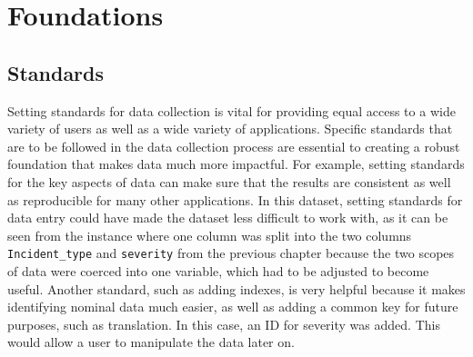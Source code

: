 \documentclass[
]{book}
\newenvironment{Shaded}{\begin{snugshade}}{\end{snugshade}}
\newcommand{\DataTypeTok}[1]{\textcolor[rgb]{0.13,0.29,0.53}{#1}}
\newcommand{\DecValTok}[1]{\textcolor[rgb]{0.00,0.00,0.81}{#1}}
\newcommand{\KeywordTok}[1]{\textcolor[rgb]{0.13,0.29,0.53}{\textbf{#1}}}
\newcommand{\NormalTok}[1]{#1}
\newcommand{\OperatorTok}[1]{\textcolor[rgb]{0.81,0.36,0.00}{\textbf{#1}}}
\newcommand{\StringTok}[1]{\textcolor[rgb]{0.31,0.60,0.02}{#1}}
\begin{document}
\hypertarget{foundations}{%
\chapter{Foundations}\label{foundations}}

\hypertarget{standards}{%
\section{Standards}\label{standards}}

Setting standards for data collection is vital for providing equal access to a wide variety of users as well as a wide variety of applications. Specific standards that are to be followed in the data collection process are essential to creating a robust foundation that makes data much more impactful. For example, setting standards for the key aspects of data can make sure that the results are consistent as well as reproducible for many other applications. In this dataset, setting standards for data entry could have made the dataset less difficult to work with, as it can be seen from the instance where one column was split into the two columns \texttt{Incident\_type} and \texttt{severity} from the previous chapter because the two scopes of data were coerced into one variable, which had to be adjusted to become useful. Another standard, such as adding indexes, is very helpful because it makes identifying nominal data much easier, as well as adding a common key for future purposes, such as translation. In this case, an ID for severity was added. This would allow a user to manipulate the data later on.

\begin{Shaded}
\end{Shaded}
\end{document}

